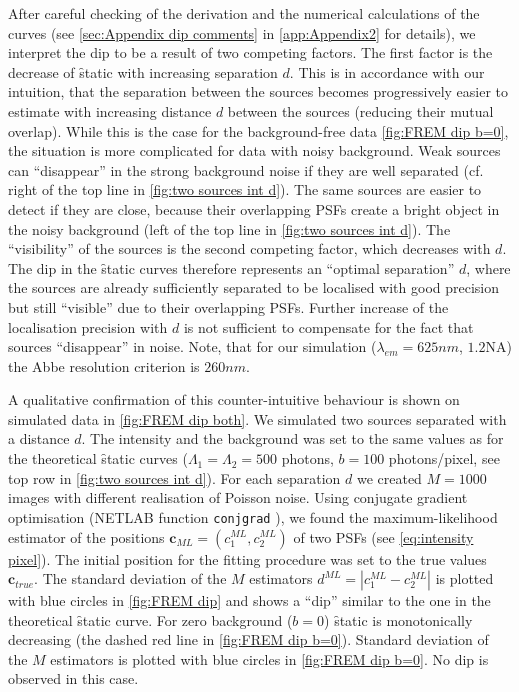 After careful checking of the derivation and the numerical calculations of the curves (see \autoref{sec:Appendix dip comments} in \autoref{app:Appendix2} for details), we interpret the dip to be a result of two competing factors. The first factor is the decrease of \f{static} with increasing separation $d$. This is in accordance with our intuition, that the separation between the sources becomes progressively easier to estimate with increasing distance $d$ between the sources (reducing their mutual overlap). While this is the case for the background-free data \autoref{fig:FREM dip b=0}, the situation is more complicated for data with noisy background. Weak sources can ``disappear'' in the strong background noise if they are well separated (cf. right of the top line in \autoref{fig:two sources int d}). The same sources are easier to detect if they are close, because their overlapping PSFs create a bright object in the noisy background (left of the top line in \autoref{fig:two sources int d}). The ``visibility'' of the sources is the second competing factor, which decreases with $d$. The dip in the \f{static} curves therefore represents an ``optimal separation'' $d$, where the sources are already sufficiently separated to be localised with good precision but still ``visible'' due to their overlapping PSFs. Further increase of the localisation precision with $d$ is not sufficient to compensate for the fact that sources ``disappear'' in noise. Note, that for our simulation ($\lambda_{em}=625\unit{nm}$, $1.2$NA) the Abbe resolution criterion is $260\unit{nm}$.


A qualitative confirmation of this counter-intuitive behaviour is shown on simulated data in \autoref{fig:FREM dip both}. We simulated two sources separated with a distance $d$. The intensity and the background was set to the same values as for the theoretical \f{static} curves ($\Lambda_1=\Lambda_2=500$ photons, $b=100$ photons/pixel, see top row in \autoref{fig:two sources int d}). For each separation $d$ we created $M=1000$ images with different realisation of Poisson noise. Using conjugate gradient optimisation (NETLAB function {\tt conjgrad} \cite{Nabney}), we found the maximum-likelihood estimator of the positions $\bm{c}_{ML}=(c^{ML}_1,c^{ML}_2)$ of two PSFs (see \autoref{eq:intensity pixel}). The initial position for the fitting procedure was set to the true values $\bm{c}_{true}$. The standard deviation of the $M$ estimators $d^{ML}=|c^{ML}_1-c^{ML}_2|$ is plotted with blue circles in \autoref{fig:FREM dip} and shows a ``dip'' similar to the one in the theoretical \f{static} curve. For zero background ($b=0$) \f{static} is monotonically decreasing (the dashed red line in \autoref{fig:FREM dip b=0}). Standard deviation of the $M$ estimators is plotted with blue circles in \autoref{fig:FREM dip b=0}. No dip is observed in this case. 

